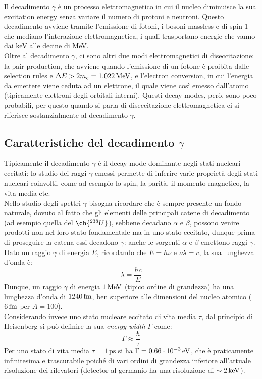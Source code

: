 Il decadimento $ \gamma $ è un processo elettromagnetico in cui il nucleo diminuisce la sua excitation energy senza variare il numero di protoni e neutroni. Questo decadimento avviene tramite l'emissione di fotoni, i bosoni massless e di spin 1 che mediano l'interazione elettromagnetica, i quali trasportano energie che vanno dai keV alle decine di MeV.\\
Oltre al decadimento $ \gamma $, ci sono altri due modi elettromagnetici di diseccitazione: la pair production, che avviene quando l'emissione di un fotone è proibita dalle selection rules e $ \Delta E > 2m_e = 1.022 \,\mathrm{MeV} $, e l'electron conversion, in cui l'energia da emettere viene ceduta ad un elettrone, il quale viene così emesso dall'atomo (tipicamente elettroni degli orbitali interni). Questi decay modes, però, sono poco probabili, per questo quando si parla di diseccitazione elettromagnetica ci si riferisce sostanzialmente al decadimento $ \gamma $.

\subsection{Caratteristiche del decadimento \texorpdfstring{$ \gamma $}{TEXT}}

Tipicamente il decadimento $ \gamma $ è il decay mode dominante negli stati nucleari eccitati: lo studio dei raggi $ \gamma $ emessi permette di inferire varie proprietà degli stati nucleari coinvolti, come ad esempio lo spin, la parità, il momento magnetico, la vita media etc.\\
Nello studio degli spettri $ \gamma $ bisogna ricordare che è sempre presente un fondo naturale, dovuto al fatto che gli elementi delle principali catene di decadimento (ad esempio quella del $ \ch{^{238}U} $), sebbene decadano $ \alpha $ e $ \beta $, possono venire prodotti non nel loro stato fondamentale ma in uno stato eccitato, dunque prima di proseguire la catena essi decadono $ \gamma $: anche le sorgenti $ \alpha $ e $ \beta $ emettono raggi $ \gamma $.\\
Dato un raggio $ \gamma $ di energia $ E $, ricordando che $ E = h \nu $ e $ \nu \lambda = c $, la sua lunghezza d'onda è:
\begin{equation}
	\lambda = \frac{hc}{E}
	\label{eq:2.36}
\end{equation}
Dunque, un raggio $ \gamma $ di energia $ 1\,\mathrm{MeV} $ (tipico ordine di grandezza) ha una lunghezza d'onda di $ 1240\,\mathrm{fm} $, ben superiore alle dimensioni del nucleo atomico ($ 6\,\mathrm{fm} $ per $ A = 100 $).\\
Considerando invece uno stato nucleare eccitato di vita media $ \tau $, dal principio di Heisenberg si può definire la sua \textit{energy width} $ \Gamma $ come:
\begin{equation}
	\Gamma \approx \frac{\hbar}{\tau}
	\label{eq:2.37}
\end{equation}
Per uno stato di vita media $ \tau = 1 \,\text{ps} $ si ha $ \Gamma = 0.66 \cdot 10^{-3} \,\mathrm{eV} $, che è praticamente infinitesima e trascurabile poiché di vari ordini di grandezza inferiore all'attuale risoluzione dei rilevatori (detector al germanio ha una risoluzione di $ \sim 2\,\mathrm{keV} $).

